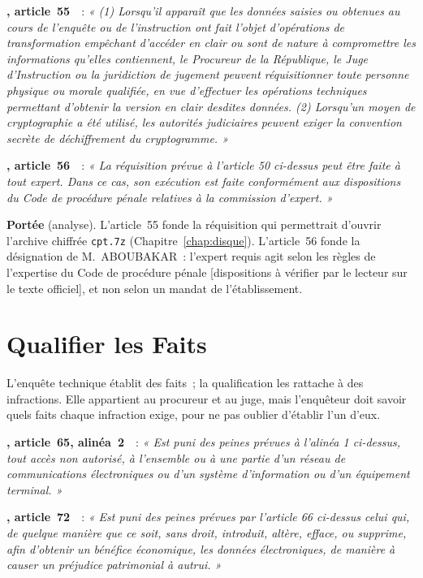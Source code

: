 \begin{boxjuris}
\textbf{, article~55}~\cite{loi2010012}~:
\textit{« (1) Lorsqu'il apparaît que les données saisies ou obtenues au
cours de l'enquête ou de l'instruction ont fait l'objet d'opérations de
transformation empêchant d'accéder en clair ou sont de nature à
compromettre les informations qu'elles contiennent, le Procureur de la
République, le Juge d'Instruction ou la juridiction de jugement peuvent
réquisitionner toute personne physique ou morale qualifiée, en vue
d'effectuer les opérations techniques permettant d'obtenir la version en
clair desdites données. (2) Lorsqu'un moyen de cryptographie a été utilisé,
les autorités judiciaires peuvent exiger la convention secrète de
déchiffrement du cryptogramme. »}

\medskip
\textbf{, article~56}~\cite{loi2010012}~:
\textit{« La réquisition prévue à l'article 50 ci-dessus peut être faite à
tout expert. Dans ce cas, son exécution est faite conformément aux
dispositions du Code de procédure pénale relatives à la commission
d'expert. »}

\medskip
\textbf{Portée} (analyse). L'article~55 fonde la réquisition qui permettrait
d'ouvrir l'archive chiffrée \texttt{cpt.7z} (Chapitre~\ref{chap:disque}).
L'article~56 fonde la désignation de M.~ABOUBAKAR~: l'expert requis agit
selon les règles de l'expertise du Code de procédure pénale [dispositions à
vérifier par le lecteur sur le texte officiel], et non selon un mandat de
l'établissement.
\end{boxjuris}

\section{Qualifier les Faits}
\label{sec:c08-infractions}

L'enquête technique établit des faits~; la qualification les rattache à des
infractions. Elle appartient au procureur et au juge, mais l'enquêteur doit
savoir quels faits chaque infraction exige, pour ne pas oublier d'établir
l'un d'eux.

\begin{boxjuris}
\textbf{, article~65, alinéa~2}~\cite{loi2010012}~:
\textit{« Est puni des peines prévues à l'alinéa 1 ci-dessus, tout accès non
autorisé, à l'ensemble ou à une partie d'un réseau de communications
électroniques ou d'un système d'information ou d'un équipement
terminal. »}

\medskip
\textbf{, article~72}~\cite{loi2010012}~:
\textit{« Est puni des peines prévues par l'article 66 ci-dessus celui qui,
de quelque manière que ce soit, sans droit, introduit, altère, efface, ou
supprime, afin d'obtenir un bénéfice économique, les données électroniques,
de manière à causer un préjudice patrimonial à autrui. »}
\end{boxjuris}

